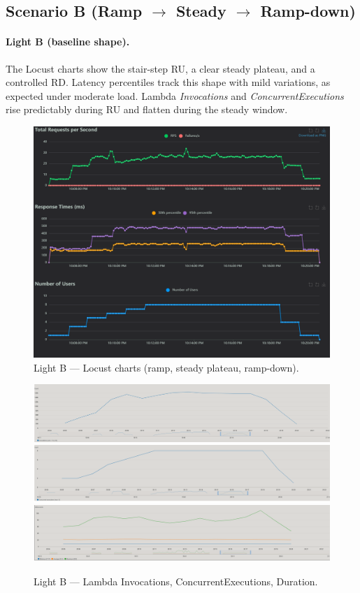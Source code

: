 \documentclass[11pt,a4paper]{article}
\begin{document}
\subsection{Scenario B (Ramp $\rightarrow$ Steady $\rightarrow$ Ramp-down)}\label{subsec:resB}

\paragraph{Light B (baseline shape).}
The Locust charts show the stair-step RU, a clear steady plateau, and a controlled RD. Latency percentiles track this shape with mild variations, as expected under moderate load. Lambda \emph{Invocations} and \emph{ConcurrentExecutions} rise predictably during RU and flatten during the steady window.

\begin{figure}[h!] \centering
  \includegraphics[width=\linewidth]{"figures/lB - Charts.png"}
  \caption{Light B --- Locust charts (ramp, steady plateau, ramp-down).}
\end{figure}

\begin{figure}[h!] \centering
  \includegraphics[width=.32\linewidth]{"figures/lB - Invocations.png"}\hfill
  \includegraphics[width=.32\linewidth]{"figures/lB - ConcEx.png"}\hfill
  \includegraphics[width=.32\linewidth]{"figures/lB - Duration.png"}
  \caption{Light B --- Lambda Invocations, ConcurrentExecutions, Duration.}
\end{figure}
\end{document}

